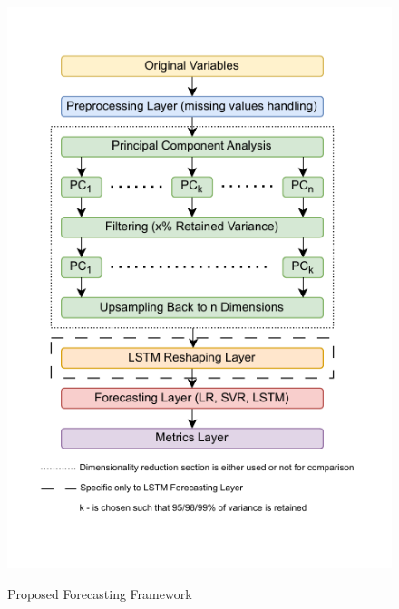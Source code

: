 \begin{figure}[!h]
    \centering
    \caption{Proposed Forecasting Framework}
        \includegraphics[width=1\textwidth]{Figures/Forecasting_framework.drawio.pdf}
    \label{fig:forecasting_framework}
\end{figure}